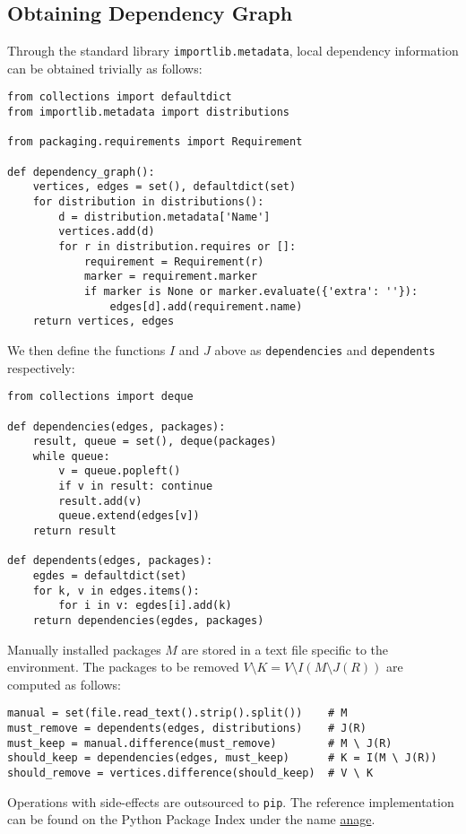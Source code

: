 \documentclass[a4paper,12pt]{article}
\begin{document}
\subsection{Obtaining Dependency Graph}
Through the standard library \verb|importlib.metadata|,
local dependency information can be obtained trivially as follows:
\begin{verbatim}
from collections import defaultdict
from importlib.metadata import distributions

from packaging.requirements import Requirement

def dependency_graph():
    vertices, edges = set(), defaultdict(set)
    for distribution in distributions():
        d = distribution.metadata['Name']
        vertices.add(d)
        for r in distribution.requires or []:
            requirement = Requirement(r)
            marker = requirement.marker
            if marker is None or marker.evaluate({'extra': ''}):
                edges[d].add(requirement.name)
    return vertices, edges
\end{verbatim}

We then define the functions $I$ and $J$ above
as \verb|dependencies| and \verb|dependents| respectively:

\begin{verbatim}
from collections import deque

def dependencies(edges, packages):
    result, queue = set(), deque(packages)
    while queue:
        v = queue.popleft()
        if v in result: continue
        result.add(v)
        queue.extend(edges[v])
    return result

def dependents(edges, packages):
    egdes = defaultdict(set)
    for k, v in edges.items():
        for i in v: egdes[i].add(k)
    return dependencies(egdes, packages)
\end{verbatim}

Manually installed packages $M$ are stored in a text file
specific to the environment.  The packages to be removed
$V \setminus K = V \setminus I(M \setminus J(R))$ are computed as follows:
\begin{verbatim}
manual = set(file.read_text().strip().split())    # M
must_remove = dependents(edges, distributions)    # J(R)
must_keep = manual.difference(must_remove)        # M \ J(R)
should_keep = dependencies(edges, must_keep)      # K = I(M \ J(R))
should_remove = vertices.difference(should_keep)  # V \ K
\end{verbatim}

Operations with side-effects are outsourced to \verb|pip|.
The reference implementation can be found on the Python Package Index
under the name \href{https://pypi.org/project/anage}{anage}.
\end{document}
